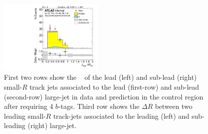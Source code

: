 \begin{figure}[htbp!]
\begin{center}
\includegraphics[width=0.45\textwidth,angle=-90]{figures/boosted/Control/b77_FourTag_Control_sublHCand_trk_dr.pdf}
  \caption{First two rows show the \pt~ of the lead (left) and sub-lead (right) small-$R$ track jets associated to the lead (first-row) and sub-lead (second-row) large-\R jet in data and prediction in the control region after requiring 4 $b$-tags. Third row shows the $\Delta R$ between two leading small-$R$ track-jets associated to the leading (left) and sub-leading (right) large-\R jet.  }
  \label{fig:boosted-4b-control-ak2}
\end{center}
\end{figure}


